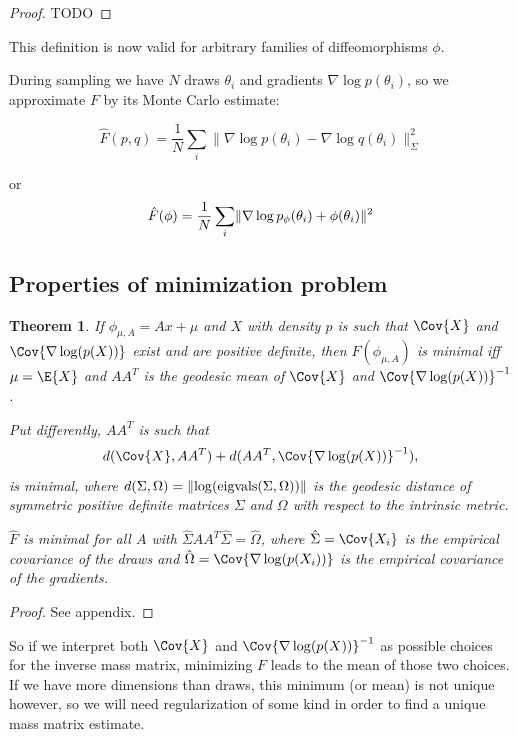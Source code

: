 \documentclass{scrartcl}
\DeclareMathOperator{\eigvals}{eigvals}
\DeclarePairedDelimiter{\norm}{\lVert}{\rVert}
\newtheorem{thm}{Theorem}
\begin{document}
\begin{proof}
TODO
\end{proof}

This definition is now valid for arbitrary families of diffeomorphisms $\phi$.

During sampling we have $N$ draws $\theta_i$ and gradients $\nabla \log
p(\theta_i)$, so we approximate $F$ by its Monte Carlo estimate:

\[
\hat{F}(p, q)
  = \frac{1}{N} \sum_i \lVert \nabla \log p(\theta_i)
    - \nabla \log q(\theta_i)\rVert^2_\Sigma
\]

or
\[
\hat{F}(\phi)
  = \frac{1}{N} \sum_i
    \norm{\nabla \log p_\phi(\theta_i) + \phi(\theta_i)}^2
\]

\subsection{Properties of minimization problem}

\begin{thm}
If $\phi_{\mu, A} = Ax + \mu$ and $X$ with density $p$ is such that $\Cov{X}$
and $\Cov{\nabla \log(p(X))}$ exist and are positive definite, then
$F(\phi_{\mu, A})$ is minimal iff $\mu = \E{X}$ and $AA^T$ is the
geodesic mean of $\Cov{X}$ and $\Cov{\nabla \log(p(X))}^{-1}$.

Put differently, $AA^T$ is such that
\[
d(\Cov{X}, AA^T) + d(AA^T, \Cov{\nabla\log(p(X))}^{-1}),
\]
is minimal, where $d(\Sigma, \Omega) = \norm{\log(\eigvals(\Sigma, \Omega))}$
is the geodesic distance of symmetric positive definite matrices
$\Sigma$ and $\Omega$ with respect to the intrinsic metric.

$\hat{F}$ is minimal for all $A$ with $\hat{\Sigma} AA^T\hat{\Sigma} =
\hat{\Omega}$, where $\hat{\Sigma} = \Cov{X_i}$ is the empirical
covariance of the draws and $\hat{\Omega} = \Cov{\nabla \log(p(X_i))}$ is
the empirical covariance of the gradients.
\end{thm}

\begin{proof}
See appendix.
\end{proof}

So if we interpret both $\Cov{X}$ and $\Cov{\nabla \log(p(X))}^{-1}$ as
possible choices for the inverse mass matrix, minimizing $F$ leads to the mean
of those two choices. If we have more dimensions than draws, this minimum (or
mean) is not unique however, so we will need regularization of some kind in
order to find a unique mass matrix estimate.
\end{document}

